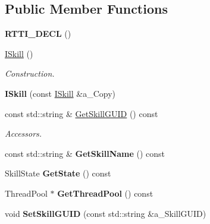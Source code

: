 \subsection*{Public Member Functions}
\begin{DoxyCompactItemize}
\item 
\mbox{\label{class_i_skill_af1abce61a0ffd7be80faba049f24ab9d}} 
{\bfseries R\+T\+T\+I\+\_\+\+D\+E\+CL} ()
\item 
\mbox{\label{class_i_skill_a8c88240c8b9631177869f65b869d23c6}} 
\hyperlink{class_i_skill_a8c88240c8b9631177869f65b869d23c6}{I\+Skill} ()
\begin{DoxyCompactList}\small\item\em Construction. \end{DoxyCompactList}\item 
\mbox{\label{class_i_skill_a96a180cf214bac70ff74e4f3d5165805}} 
{\bfseries I\+Skill} (const \hyperlink{class_i_skill}{I\+Skill} \&a\+\_\+\+Copy)
\item 
\mbox{\label{class_i_skill_aba339bdb6c968a639d91907d42b8994c}} 
const std\+::string \& \hyperlink{class_i_skill_aba339bdb6c968a639d91907d42b8994c}{Get\+Skill\+G\+U\+ID} () const
\begin{DoxyCompactList}\small\item\em Accessors. \end{DoxyCompactList}\item 
\mbox{\label{class_i_skill_ade77820fbba37899f0219eb114f717a8}} 
const std\+::string \& {\bfseries Get\+Skill\+Name} () const
\item 
\mbox{\label{class_i_skill_ac7bb2e88855f01c2cc2c0dd3543cab60}} 
Skill\+State {\bfseries Get\+State} () const
\item 
\mbox{\label{class_i_skill_aa4c77ec612e7167ea657e001baabc3e7}} 
Thread\+Pool $\ast$ {\bfseries Get\+Thread\+Pool} () const
\item 
\mbox{\label{class_i_skill_aa906e5e27ed9262e4b0eb630b999af7a}} 
void {\bfseries Set\+Skill\+G\+U\+ID} (const std\+::string \&a\+\_\+\+Skill\+G\+U\+ID)
\item 

\end{DoxyCompactItemize}

